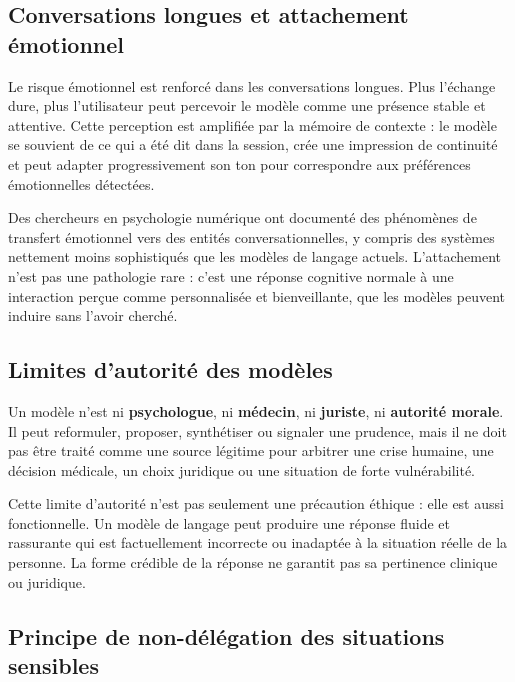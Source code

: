 \documentclass[
  10pt,
  a4paper,
  DIV=11,
  numbers=noendperiod,
  oneside]{scrreprt}
\let\oldtextbf\textbf
\renewcommand{\textbf}[1]{\oldtextbf{\textcolor{cmmnavy}{#1}}}
\begin{document}
\subsection{Conversations longues et attachement
émotionnel}\label{conversations-longues-et-attachement-uxe9motionnel}

Le risque émotionnel est renforcé dans les conversations longues. Plus
l'échange dure, plus l'utilisateur peut percevoir le modèle comme une
présence stable et attentive. Cette perception est amplifiée par la
mémoire de contexte : le modèle se souvient de ce qui a été dit dans la
session, crée une impression de continuité et peut adapter
progressivement son ton pour correspondre aux préférences émotionnelles
détectées.

Des chercheurs en psychologie numérique ont documenté des phénomènes de
transfert émotionnel vers des entités conversationnelles, y compris des
systèmes nettement moins sophistiqués que les modèles de langage
actuels. L'attachement n'est pas une pathologie rare : c'est une réponse
cognitive normale à une interaction perçue comme personnalisée et
bienveillante, que les modèles peuvent induire sans l'avoir cherché.

\subsection{Limites d'autorité des
modèles}\label{limites-dautorituxe9-des-moduxe8les}

Un modèle n'est ni \textbf{psychologue}, ni \textbf{médecin}, ni
\textbf{juriste}, ni \textbf{autorité morale}. Il peut reformuler,
proposer, synthétiser ou signaler une prudence, mais il ne doit pas être
traité comme une source légitime pour arbitrer une crise humaine, une
décision médicale, un choix juridique ou une situation de forte
vulnérabilité.

Cette limite d'autorité n'est pas seulement une précaution éthique :
elle est aussi fonctionnelle. Un modèle de langage peut produire une
réponse fluide et rassurante qui est factuellement incorrecte ou
inadaptée à la situation réelle de la personne. La forme crédible de la
réponse ne garantit pas sa pertinence clinique ou juridique.

\subsection{Principe de non-délégation des situations
sensibles}\label{principe-de-non-duxe9luxe9gation-des-situations-sensibles}
\end{document}
